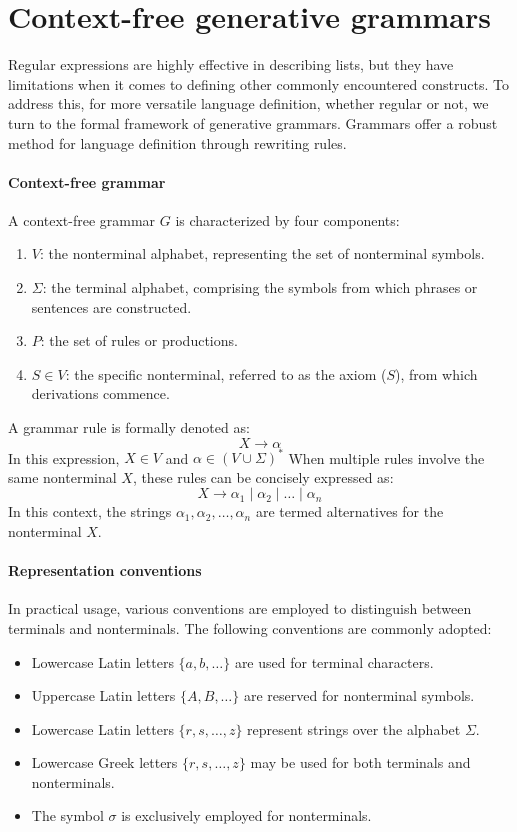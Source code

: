 \section{Context-free generative grammars}

Regular expressions are highly effective in describing lists, but they have limitations when it comes to defining other commonly encountered constructs. 
To address this, for more versatile language definition, whether regular or not, we turn to the formal framework of generative grammars.
Grammars offer a robust method for language definition through rewriting rules.

\paragraph*{Context-free grammar}
A context-free grammar $G$ is characterized by four components:
\begin{enumerate}
    \item $V$: the nonterminal alphabet, representing the set of nonterminal symbols.
    \item $\Sigma$: the terminal alphabet, comprising the symbols from which phrases or sentences are constructed.
    \item $P$: the set of rules or productions.
    \item $S \in V$: the specific nonterminal, referred to as the axiom ($S$), from which derivations commence.
\end{enumerate}
A grammar rule is formally denoted as:
\[X \rightarrow \alpha\]
In this expression, $X \in V$ and $\alpha \in (V \cup \Sigma)^{\ast}$
When multiple rules involve the same nonterminal $X$, these rules can be concisely expressed as:
\[X \rightarrow \alpha_1 \mid \alpha_2 \mid \dots \mid \alpha_n\]
In this context, the strings $\alpha_1,\alpha_2,\dots,\alpha_n$ are termed alternatives for the nonterminal $X$.

\paragraph*{Representation conventions}
In practical usage, various conventions are employed to distinguish between terminals and nonterminals. 
The following conventions are commonly adopted:
\begin{itemize}
    \item Lowercase Latin letters $\{a,b,\dots\}$ are used for terminal characters.
    \item Uppercase Latin letters $\{A,B,\dots\}$ are reserved for nonterminal symbols.
    \item Lowercase Latin letters $\{r,s,\dots,z\}$ represent strings over the alphabet $\Sigma$.
    \item Lowercase Greek letters $\{r,s,\dots,z\}$ may be used for both terminals and nonterminals.
    \item The symbol $\sigma$ is exclusively employed for nonterminals.
\end{itemize}

